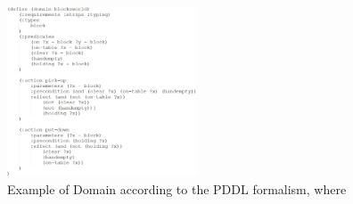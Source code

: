 \begin{figure}[t]
    \centering
    \includegraphics[width=0.5\textwidth]{figures/images/ch4/example_domain_definition.jpg}
    \caption{Example of Domain according to the PDDL formalism, where }
    \label{fig:example_domain_definition}
\end{figure}
